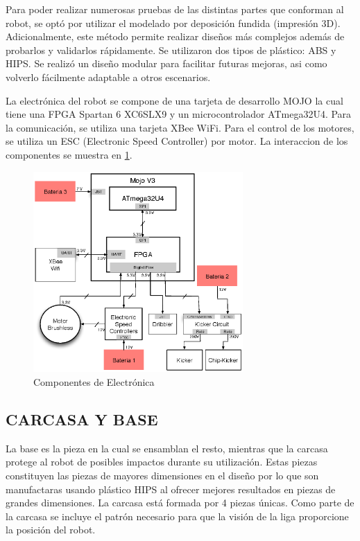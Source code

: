 \documentclass[twocolumn,10pt]{amrob}
\begin{document}
Para poder realizar numerosas pruebas de las distintas partes que conforman al robot, se optó por utilizar el modelado por deposición fundida (impresión 3D). Adicionalmente, este método permite realizar diseños más complejos además de probarlos y validarlos rápidamente. Se utilizaron dos tipos de plástico: ABS y HIPS. Se realizó un diseño modular para facilitar futuras mejoras, asi como volverlo fácilmente adaptable a otros escenarios.\par

La electrónica del robot se compone de una tarjeta de desarrollo MOJO la cual tiene una FPGA Spartan 6 XC6SLX9 y un microcontrolador ATmega32U4. Para la comunicaci\'on, se utiliza una tarjeta XBee WiFi. Para el control de los motores, se utiliza un ESC (Electronic Speed Controller) por motor. La interaccion de los componentes se muestra en \ref{fig:electGral}. \par
\begin{figure}
  \centering
    \includegraphics[width=8cm]{diagElectronica.eps}
  \caption{Componentes de Electrónica}
  \label{fig:electGral}
\end{figure}
\subsection*{CARCASA Y BASE}
La base es la pieza en la cual se ensamblan el resto, mientras que la carcasa protege al robot de posibles impactos durante su utilización. Estas piezas constituyen las piezas de mayores dimensiones en el dise\~no por lo que son manufactaras usando plástico HIPS al ofrecer mejores resultados en piezas de grandes dimensiones. La carcasa est\'a formada por 4 piezas \'unicas. Como parte de la carcasa se incluye el patrón necesario para que la visi\'on de la liga proporcione la posici\'on del robot.\par
\end{document}
